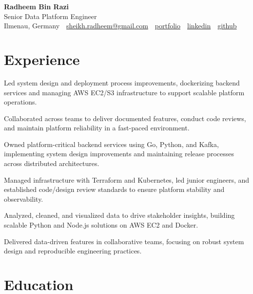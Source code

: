 \documentclass[11pt,a4paper]{resume}
\makeatletter
\newcommand{\Portfolio}{https://radheem.github.io/my-cv}
\newcommand{\PortfolioText}{portfolio}
\newcommand{\GitHub}{https://github.com/radheem}
\newcommand{\LinkedIn}{https://www.linkedin.com/in/radheem-razi}
\newcommand{\Email}{sheikh.radheem@gmail.com}
\makeatother
\begin{document}
\begin{center}
  {\huge\bfseries Radheem Bin Razi}\\[3pt]
  {\large Senior Data Platform Engineer}\\[6pt]
  \small
  Ilmenau, Germany \,\textbar\,
  \href{mailto:\Email}{\Email} \,\textbar\,
  \href{\Portfolio}{\PortfolioText} \,\textbar\,
  \href{\LinkedIn}{linkedin} \,\textbar\,
  \href{\GitHub}{github}
\end{center}
\vspace{2pt}

\section{Experience}

\bullets
  \item Led system design and deployment process improvements, dockerizing backend services and managing AWS EC2/S3 infrastructure to support scalable platform operations.
  \item Collaborated across teams to deliver documented features, conduct code reviews, and maintain platform reliability in a fast-paced environment.
\bulletsend
\vspace{3pt}
\bullets
  \item Owned platform-critical backend services using Go, Python, and Kafka, implementing system design improvements and maintaining release processes across distributed architectures.
  \item Managed infrastructure with Terraform and Kubernetes, led junior engineers, and established code/design review standards to ensure platform stability and observability.
\bulletsend
\vspace{3pt}
\bullets
  \item Analyzed, cleaned, and visualized data to drive stakeholder insights, building scalable Python and Node.js solutions on AWS EC2 and Docker.
  \item Delivered data-driven features in collaborative teams, focusing on robust system design and reproducible engineering practices.
\bulletsend
\vspace{3pt}

\section{Education}
\end{document}
